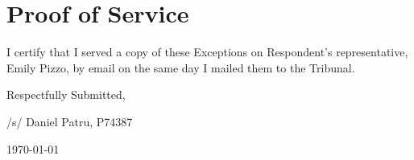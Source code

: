 \documentclass[12pt,\documentclassflag]{michiganCourtOfAppealsBrief}
\begin{document}
\section{Proof of Service}

I certify that I served a copy of these Exceptions on Respondent's representative, Emily Pizzo, by email on the same day I mailed them to the Tribunal.

\vspace{1\baselineskip}

{ \setlength{\leftskip}{3.5in}

  Respectfully Submitted,

  /s/ Daniel Patru, P74387

\today

  \setlength{\leftskip}{0pt}}

\newpage\empty%
\end{document}
